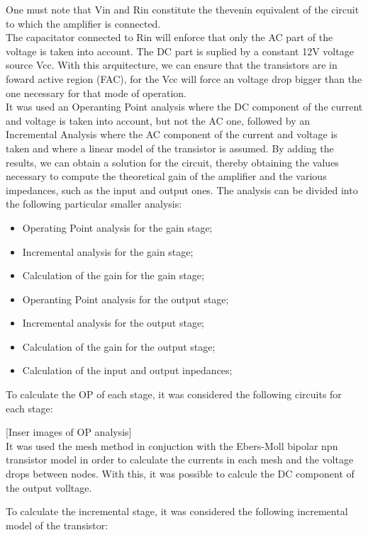 One must note that Vin and Rin constitute the thevenin equivalent of the circuit to which the amplifier is connected.\\
The capacitator connected to Rin will enforce that only the AC part of the voltage is taken into account. The DC part is suplied by a constant 12V voltage source Vcc. With this arquitecture, we can ensure that the transistors are in foward active region (FAC), for the Vcc will force an voltage drop bigger than the one necessary for that mode of operation.\\
It was used an Operanting Point analysis where the DC component of the current and voltage is taken into account, but not the AC one, followed by an Incremental Analysis where the AC component of the current and voltage is taken and where a linear model of the transistor is assumed. By adding the results, we can obtain a solution for the circuit, thereby obtaining the values necessary to compute the theoretical gain of the amplifier and the various impedances, such as the input and output ones.
The analysis can be divided into the following particular smaller analysis:
\begin{itemize}
	\item Operating Point analysis for the gain stage;
	\item Incremental analysis for the gain stage;
	\item Calculation of the gain for the gain stage;
	\item Operanting Point analysis for the output stage;
	\item Incremental analysis for the output stage;
	\item Calculation of the gain for the output stage;
	\item Calculation of the input and output inpedances;
\end{itemize}

To calculate the OP of each stage, it was considered the following circuits for each stage:

[Inser images of OP analysis]\\


It was used the mesh method in conjuction with the Ebers-Moll bipolar npn transistor model in order to calculate the currents in each mesh and the voltage drops between nodes. With this, it was possible to calcule the DC component of the output volltage.\

To calculate the incremental stage, it was considered the following incremental model of the transistor:\\


